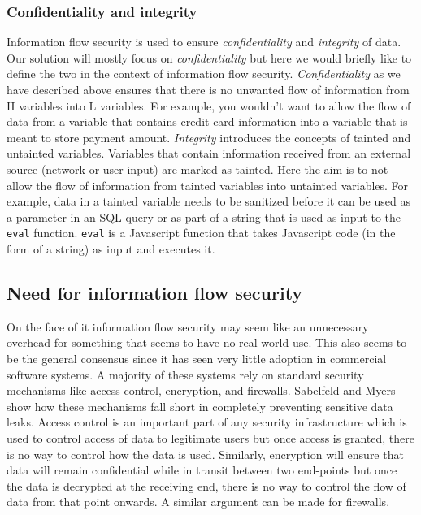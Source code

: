 \subsubsection{Confidentiality and integrity}
Information flow security is used to ensure \textit{confidentiality} and \textit{integrity}
of data. Our solution will mostly focus on \textit{confidentiality} but here we would
briefly like to define the two in the context of information flow security.
\textit{Confidentiality} as we have described above ensures that there is no unwanted
flow of information from H variables into L variables. For example, you wouldn't
want to allow the flow of data from a variable that contains credit card information
into a variable that is meant to store payment amount. \textit{Integrity} introduces
the concepts of tainted and untainted variables. Variables that contain information
received from an external source (network or user input) are marked as tainted. Here
the aim is to not allow the flow of information from tainted variables into untainted
variables. For example, data in a tainted variable needs to be sanitized before it
can be used as a parameter in an SQL query or as part of a string that is used as
input to the \texttt{eval} function. \texttt{eval} is a Javascript function that
takes Javascript code (in the form of a string) as input and executes it.

\subsection{Need for information flow security}
On the face of it information flow security may seem like an unnecessary overhead
for something that seems to have no real world use. This also seems to be the general
consensus since it has seen very little adoption in commercial software systems.
A majority of these systems rely on standard security mechanisms like access control,
encryption, and firewalls. Sabelfeld and Myers~\cite{LangInfo} show how these mechanisms
fall short in completely preventing sensitive data leaks. Access control is an
important part of any security infrastructure which is used to control access of
data to legitimate users but once access is granted, there is no way to control
how the data is used. Similarly, encryption will ensure that data will remain
confidential while in transit between two end-points but once the data is decrypted
at the receiving end, there is no way to control the flow of data from that point
onwards. A similar argument can be made for firewalls.

